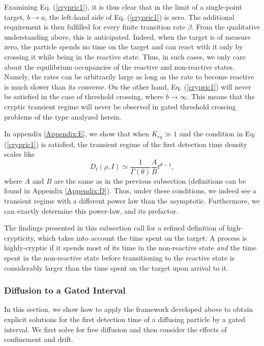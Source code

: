 Examining Eq. (\ref{crypric1}), it is thus clear that in the limit of a single-point target, $b \to a$, the left-hand side of Eq. (\ref{crypric1}) is zero. The additional requirement is then fulfilled for every finite transition rate $\beta$. From the qualitative understanding above, this is anticipated. Indeed, when the target is of measure zero, the particle spends no time on the target and can react with it only by crossing it while being in the reactive state. Thus, in such cases, we only care about the equilibrium occupancies of the reactive and non-reactive states. Namely, the rates can be arbitrarily large as long as the rate to become reactive is much slower than its converse. On the other hand, Eq. (\ref{crypric1}) will never be satisfied in the case of threshold crossing, where $b \to \infty$. This means that the cryptic transient regime will never be observed in gated threshold crossing problems of the type analyzed herein.

In appendix \ref{Appendix:E}, we show that when $K_{eq} \gg 1$ and the condition in Eq. (\ref{crypric1}) is satisfied, the transient regime of the first detection time density scales like
%
\begin{equation} \label{crypric2}
D_t(\rho, I) \simeq \frac{1}{\Gamma(\theta)}\frac{A}{B}  t^{\theta-1}  ,  
\end{equation}
%
where $A$ and $B$ are the same as in the previous subsection (definitions can be found in Appendix \ref{Appendix:D}). Thus, under these conditions, we indeed see a transient regime with a different power law than the asymptotic. Furthermore, we can exactly determine this power-law, and its prefactor.

The findings presented in this subsection call for a refined definition of high-crypticity, which takes into account the time spent on the target: A process is highly-cryptic if it spends most of its time in the non-reactive state \textit{and} the time spent in the non-reactive state before transitioning to the reactive state is considerably larger than the time spent on the target upon arrival to it.



\subsubsection{Diffusion to a Gated Interval}\label{Sec:5}

In this section, we show how to apply the framework developed above to obtain explicit solutions for the first detection time of a diffusing particle by a gated interval. We first solve for free diffusion and then consider the effects of confinement and drift.
